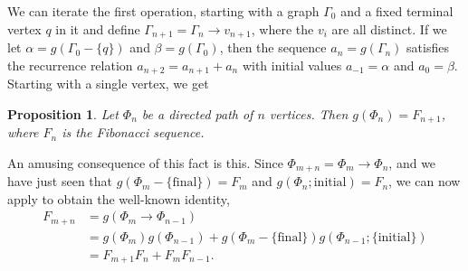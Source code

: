 \documentclass{article}
\newenvironment{enumrealm}{\setlength{\abovedisplayskip}{5pt}
\setlength{\belowdisplayskip}{5pt}}{\setlength{\abovedisplayskip}{10.0pt plus 2.0pt minus 5.0pt}
\setlength{\belowdisplayskip}{10.0pt plus 2.0pt minus 5.0pt}}
\newcommand{\fibo}[1]{F_{#1}}
\newcommand{\hthref}[1]{\hyperref[#1]{\thref{#1}}}
\theoremstyle{plain}
\newtheorem{prop}{Proposition}[section]
\theoremstyle{definition}
\begin{document}
We can iterate the first operation, starting with a graph $\Gamma_0$ and a fixed terminal vertex $q$ in it and define $\Gamma_{n + 1} = \Gamma_{n} \rightarrow v_{n + 1}$, where the $v_i$ are all distinct. If we let $\alpha = g(\Gamma_0 - \{q\})$ and $\beta = g(\Gamma_0)$, then the sequence $a_n = g(\Gamma_n)$ satisfies the recurrence relation $a_{n + 2} = a_{n + 1} + a_{n}$ with initial values $a_{-1} = \alpha$ and $a_0 = \beta$. Starting with a single vertex, we get

\begin{prop}
	Let $\Phi_n$ be a directed path of $n$ vertices. Then $g(\Phi_n) = \fibo{n + 1}$, where $\fibo{n}$ is the Fibonacci sequence.
\end{prop}

An amusing consequence of this fact is this. Since $\Phi_{m + n} = \Phi_m \rightarrow \Phi_n$, and we have just seen that $g(\Phi_m - \{\text{final}\}) = \fibo{m}$ and $g(\Phi_n; \text{initial}) = \fibo{n}$, 
we can now apply \hyperref[eustick]{\hthref{eustick}} to obtain the well-known identity, \begin{enumrealm}
\begin{align*}
	\fibo{m + n} &= g(\Phi_m \rightarrow \Phi_{n - 1}) \\
	&= g(\Phi_m)g(\Phi_{n - 1}) + g(\Phi_m - \{\text{final}\})g(\Phi_{n - 1}; \{\text{initial}\}) \\
	&= \fibo{m + 1}\fibo{n} + \fibo{m}\fibo{n - 1}.
\end{align*}\end{enumrealm}
\vspace{-\baselineskip}
\end{document}
